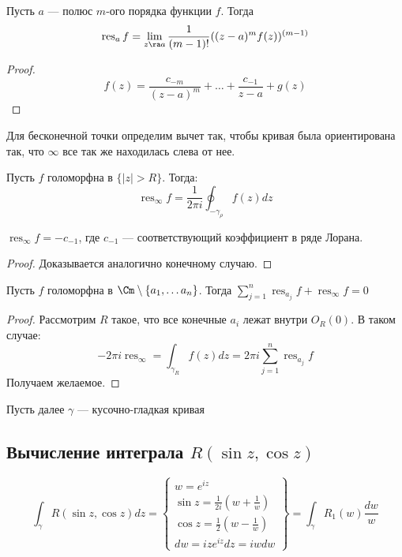 \begin{proposition}
    Пусть \(a\) --- полюс \(m\)-ого порядка функции \(f\). Тогда 
    \[\operatorname{res}_a f = \lim_{z \ra a} \frac{1}{(m - 1)!}((z - a)^mf(z))^{(m - 1)}\]
\end{proposition}
\begin{proof}
    \[f(z) = \frac{c_{-m}}{(z - a)^m} + \dots + \frac{c_{-1}}{z - a} + g(z)\]
\end{proof}

Для бесконечной точки определим вычет так, чтобы кривая была ориентирована так, что \(\infty\) все так же находилась слева от нее.

\begin{definition}
    Пусть \(f\) голоморфна в \(\{|z| > R\}\). Тогда:
    \[\operatorname{res}_\infty f = \frac{1}{2\pi i}\oint_{-\gamma_\rho}f(z)dz\]
\end{definition}

\begin{proposition}
    \(\operatorname{res}_\infty f = -c_{-1}\), где \(c_{-1}\) --- соответствующий коэффициент в ряде Лорана.
\end{proposition}
\begin{proof}
    Доказывается аналогично конечному случаю.
\end{proof}

\begin{theorem}
    Пусть \(f\) голоморфна в \(\Cm \setminus \{a_1, \dots a_n\}\). Тогда \(\sum_{j = 1}^n \operatorname{res}_{a_j} f  + \operatorname{res}_\infty f = 0\) 
\end{theorem}
\begin{proof}
    Рассмотрим \(R\) такое, что все конечные \(a_i\) лежат внутри \(O_R(0)\). В таком случае:
    \[-2\pi i \operatorname{res}_\infty = \int_{\gamma_R}f(z)dz = 2\pi i\sum_{j = 1}^n \operatorname{res}_{a_j} f\]
    Получаем желаемое.
\end{proof}

Пусть далее \(\gamma\) --- кусочно-гладкая кривая

\subsection{Вычисление интеграла \(R(\sin z, \cos z)\)}

\[\int_{\gamma} R(\sin z, \cos z) dz = \left\{\begin{array}{c}
    w = e^{iz} \\
    \sin z = \frac{1}{2i} \left(w + \frac{1}{w}\right) \\
    \cos z = \frac{1}{2} \left(w - \frac{1}{w}\right) \\
    dw = ize^{iz}dz = iwdw
\end{array}\right\} = \int_{\gamma} R_1(w) \frac{dw}{w}\]

